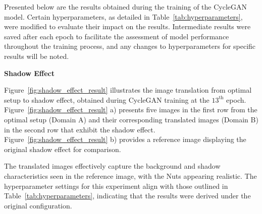 \documentclass[12pt,DIV14,BCOR12mm,a4paper,footinclude=false,headinclude,parskip=half-,twoside,openright,cleardoublepage=empty,toc=index,bibliography=totoc,listof=totoc]{scrreprt}
\numberwithin{equation}{chapter}
\begin{document}
Presented below are the results obtained during the training of the CycleGAN model. Certain hyperparameters, as detailed in Table~\ref{tab:hyperparameters}, were modified to evaluate their impact on the results. Intermediate results were saved after each epoch to facilitate the assessment of model performance throughout the training process, and any changes to hyperparameters for specific results will be noted.

\textbf{Shadow Effect}

Figure~\ref{fig:shadow_effect_result} illustrates the image translation from optimal setup to shadow effect, obtained during CycleGAN training at the \( 13^{\text{th}} \) epoch. Figure~\ref{fig:shadow_effect_result} a) presents five images in the first row from the optimal setup (Domain A) and their corresponding translated images (Domain B) in the second row that exhibit the shadow effect. Figure~\ref{fig:shadow_effect_result} b) provides a reference image displaying the original shadow effect for comparison.

The translated images effectively capture the background and shadow characteristics seen in the reference image, with the Nuts appearing realistic. The hyperparameter settings for this experiment align with those outlined in Table~\ref{tab:hyperparameters}, indicating that the results were derived under the original configuration.
\end{document}
